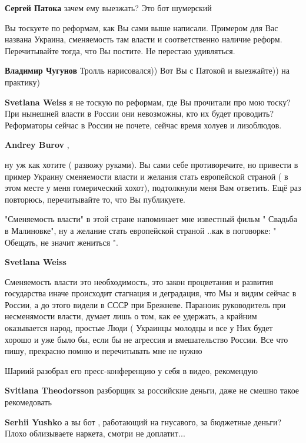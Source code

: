 \begin{itemize}
\begin{itemize}
\textbf{Сергей Патока} зачем ему выезжать? Это бот шумерский


Вы тоскуете по реформам, как Вы сами выше написали. Примером для Вас названа
Украина, сменяемость там власти и соответственно наличие реформ. Перечитывайте
тогда, что Вы постите. Не перестаю удивляться.


\textbf{Владимир Чугунов} Тролль нарисовался)) Вот Вы с Патокой и выезжайте)) на практику)

\textbf{Svetlana Weiss} я не тоскую по реформам, где Вы прочитали про мою тоску? При нынешней власти в России они невозможны, кто их будет проводить? Реформаторы сейчас в России не почете, сейчас время холуев и лизоблюдов.

\textbf{Andrey Burov} , 

ну уж как хотите ( развожу руками). Вы сами себе противоречите, но привести в
пример Украину сменяемости власти и желания стать европейской страной ( в этом
месте у меня гомерический хохот), подтолкнули меня Вам ответить. Ещё раз
повторюсь, перечитывайте то, что Вы публикуете.

"Сменяемость власти" в этой стране напоминает мне известный фильм " Свадьба в
Малиновке", ну а желание стать европейской страной ..как в поговорке: "
Обещать, не значит жениться ".

\textbf{Svetlana Weiss} 

Сменяемость власти это необходимость, это закон процветания и развития
государства иначе происходит стагнация и деградация, что Мы и видим сейчас в
России, а до этого видели в СССР при Брежневе. Параноик руководитель при
несменямости власти, думает лишь о том, как ее удержать, а крайним оказывается
народ, простые Люди ( Украинцы молодцы и все у Них будет хорошо и уже было бы,
если бы не агрессия и вмешательство России. Все что пишу, прекрасно помню и
перечитывать мне не нужно

\end{itemize} %

Шариий разобрал его пресс-конференцию у себя в видео, рекомендую

\begin{itemize} %
\textbf{Svitlana Theodorsson} разборщик за российские деньги, даже не смешно такое рекомедовать

\textbf{Serhii Yushko} а вы бот , работающий на гнусавого, за бюджетные деньги? Плохо облизываете наркета, смотри не доплатит...
\end{itemize} %


\end{itemize}
